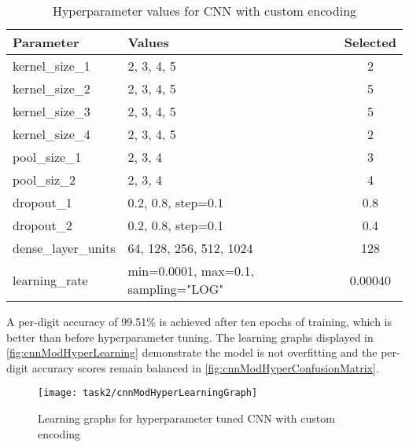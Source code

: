 \bgroup
    \begin{table}[!htbp]
        \centering
        \begin{tabular}{ll|c}
            \hline
            Parameter & Values & Selected \\ \hline
            kernel\_size\_1 & 2, 3, 4, 5 & 2 \\
            kernel\_size\_2 & 2, 3, 4, 5 & 5 \\
            kernel\_size\_3 & 2, 3, 4, 5 & 5 \\
            kernel\_size\_4 & 2, 3, 4, 5 & 2 \\
            pool\_size\_1 & 2, 3, 4 & 3 \\
            pool\_siz\_2 & 2, 3, 4 & 4 \\
            dropout\_1 & 0.2, 0.8, step=0.1 & 0.8 \\
            dropout\_2 & 0.2, 0.8, step=0.1 & 0.4 \\
            dense\_layer\_units & 64, 128, 256, 512, 1024 & 128 \\
            learning\_rate & min=0.0001, max=0.1, sampling="LOG" & 0.00040 \\
        \end{tabular}
        \caption{Hyperparameter values for CNN with custom encoding}
        \label{tbl:hyperCNNMod}
    \end{table}
\egroup

A per-digit accuracy of 99.51\% is achieved after ten epochs of training, which is better than before hyperparameter tuning. The learning graphs displayed in \autoref{fig:cnnModHyperLearning} demonstrate the model is not overfitting and the per-digit accuracy scores remain balanced in \autoref{fig:cnnModHyperConfusionMatrix}.

\begin{figure}[!htbp]
    \centering
    \texttt{[image: task2/cnnModHyperLearningGraph]}
    \caption[Learning graphs for hyperparameter tuned CNN with custom encoding]
    {Learning graphs for hyperparameter tuned CNN with custom encoding}
    \label{fig:cnnModHyperLearning}
\end{figure}



